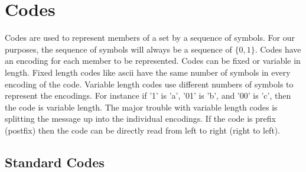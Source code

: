 \chapter{Codes}
\label{c-codes}

Codes are used to represent members of a set by a sequence of symbols.  For our purposes, the sequence of symbols will always be a sequence of $\{ 0,1\}$.  Codes have an encoding for each member to be represented. Codes can be fixed or variable in length. Fixed length codes like ascii have the same number of symbols in every encoding of the code.  Variable length codes use different numbers of symbols to represent the encodings.  For instance if '1' is 'a', '01' is 'b', and '00' is 'c', then the code is variable length.  The major trouble with variable length codes is splitting the message up into the individual encodings.  If the code is prefix (postfix) then the code can be directly read from left to right (right to left).

\section{Standard Codes}
